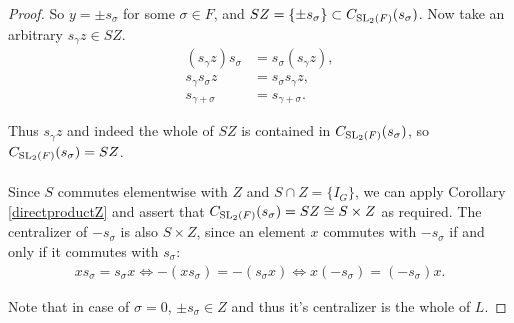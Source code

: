 \begin{proof}
So $y = \pm s_\sigma$ for some $\sigma \in F$, and $SZ = \{ \pm s_\sigma \} \subset C_{\operatorname{SL}_2(F)}(s_\sigma)$. Now take an arbitrary $s_\gamma z \in SZ$.
\begin{align*} (s_\gamma z) s_\sigma &= s_\sigma (s_\gamma z),
\\ s_\gamma s_\sigma z &= s_\sigma s_\gamma z, \tag{since $z \in Z$}
\\ s_{\gamma + \sigma} &= s_{\gamma + \sigma}.
\end{align*}

Thus $s_\gamma z$ and indeed the whole of $SZ$ is contained in $ C_{\operatorname{SL}_2(F)}(s_\sigma)$, so $C_{\operatorname{SL}_2(F)}(s_\sigma) = SZ$. \\
\\
Since $S$ commutes elementwise with $Z$ and $S \cap Z = \{ I_G \}$, we can apply Corollary \ref{directproductZ} and assert that $C_{\operatorname{SL}_2(F)}(s_\sigma) = SZ \cong S \times Z$ as required. The centralizer of $- s_\sigma$ is also $ S\times Z$, 
since an element $x$ commutes with $- s_\sigma$ if and only if it commutes with $s_\sigma$:
\begin{align*} 
    xs_\sigma = s_\sigma x \iff -(x s_\sigma) = - (s_\sigma x) \iff x(- s_\sigma) = (- s_\sigma)x.
\end{align*}

Note that in case of $\sigma = 0$, $\pm s_\sigma \in Z$ and thus it's centralizer is the whole of $L$.

\end{proof}


    

